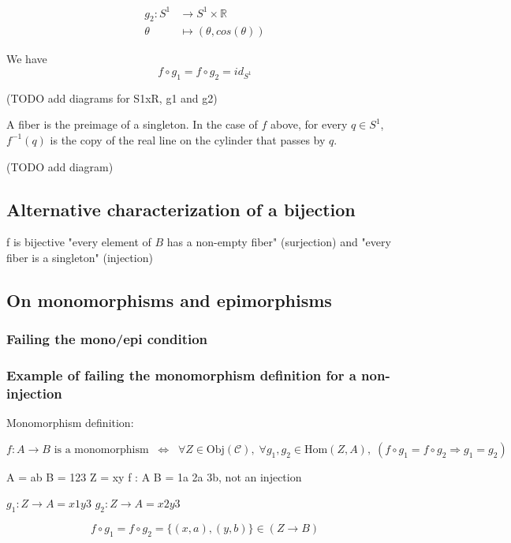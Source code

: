 \documentclass[12pt, letterpaper, twoside]{article}
\begin{document}
$$
\begin{align*}
g_2 : S^1    & \longrightarrow  S^1 \times \mathbb{R} \\
      \theta & \longmapsto      (\theta, cos(\theta))
\end{align*}
$$

We have
$$f \circ g_1 = f \circ g_2 = id_{S^1}$$

(TODO add diagrams for S1xR, g1 and g2)

A fiber is the preimage of a singleton. In the case of $f$ above, for every $q \in S^1$, $f^{-1}({q})$ is the copy of the real line on the cylinder that passes by $q$.

(TODO add diagram)






\subsection{Alternative characterization of a bijection}
f is bijective \Leftrightarrow "every element of $B$ has a non-empty fiber" (surjection) and "every fiber is a singleton" (injection)





\subsection{On monomorphisms and epimorphisms}

\subsubsection{Failing the mono/epi condition}

\subsubsection{Example of failing the monomorphism definition for a non-injection}

Monomorphism definition:

$$
\text{$f : A \to B$ is a monomorphism}
\; \; \Leftrightarrow \; \; 
\forall Z \in \text{Obj}(\mathcal{C}), \;
\forall g_1, g_2 \in \text{Hom}(Z, A), \;
(f \circ g_1 = f \circ g_2 \Rightarrow g_1 = g_2)
$$

A = ab
B = 123
Z = xy
f : A \to B = 1a 2a 3b, not an injection

$g_1 : Z \to A = x1 y3$
$g_2 : Z \to A = x2 y3$

$$f \circ g_1 = f \circ g_2 = \{(x, a), (y, b)\} \in (Z \to B)$$
\end{document}
